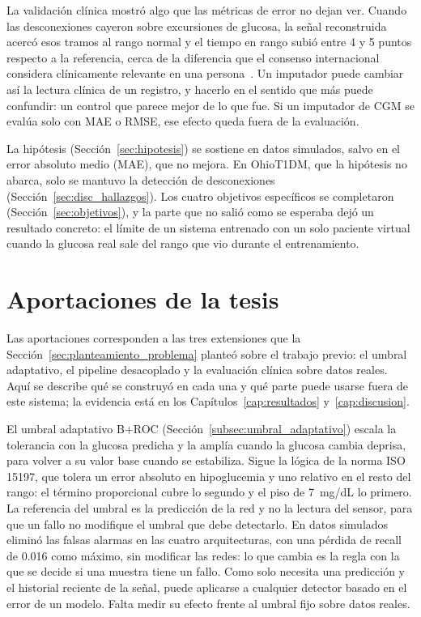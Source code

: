 \documentclass{report}
\begin{document}
La validación clínica mostró algo que las métricas de error no dejan ver. Cuando las desconexiones cayeron sobre excursiones de glucosa, la señal reconstruida acercó esos tramos al rango normal y el tiempo en rango subió entre 4 y 5 puntos respecto a la referencia, cerca de la diferencia que el consenso internacional considera clínicamente relevante en una persona~\cite{battelino2019}. Un imputador puede cambiar así la lectura clínica de un registro, y hacerlo en el sentido que más puede confundir: un control que parece mejor de lo que fue. Si un imputador de CGM se evalúa solo con MAE o RMSE, ese efecto queda fuera de la evaluación.

La hipótesis (Sección~\ref{sec:hipotesis}) se sostiene en datos simulados, salvo en el error absoluto medio (MAE), que no mejora. En OhioT1DM, que la hipótesis no abarca, solo se mantuvo la detección de desconexiones (Sección~\ref{sec:disc_hallazgos}). Los cuatro objetivos específicos se completaron (Sección~\ref{sec:objetivos}), y la parte que no salió como se esperaba dejó un resultado concreto: el límite de un sistema entrenado con un solo paciente virtual cuando la glucosa real sale del rango que vio durante el entrenamiento.

\section{Aportaciones de la tesis}
\label{sec:aportaciones}
 
Las aportaciones corresponden a las tres extensiones que la Sección~\ref{sec:planteamiento_problema} planteó sobre el trabajo previo: el umbral adaptativo, el pipeline desacoplado y la evaluación clínica sobre datos reales. Aquí se describe qué se construyó en cada una y qué parte puede usarse fuera de este sistema; la evidencia está en los Capítulos~\ref{cap:resultados} y~\ref{cap:discusion}.

El umbral adaptativo B+ROC (Sección~\ref{subsec:umbral_adaptativo}) escala la tolerancia con la glucosa predicha y la amplía cuando la glucosa cambia deprisa, para volver a su valor base cuando se estabiliza. Sigue la lógica de la norma ISO 15197, que tolera un error absoluto en hipoglucemia y uno relativo en el resto del rango: el término proporcional cubre lo segundo y el piso de 7~mg/dL lo primero. La referencia del umbral es la predicción de la red y no la lectura del sensor, para que un fallo no modifique el umbral que debe detectarlo. En datos simulados eliminó las falsas alarmas en las cuatro arquitecturas, con una pérdida de recall de 0.016 como máximo, sin modificar las redes: lo que cambia es la regla con la que se decide si una muestra tiene un fallo. Como solo necesita una predicción y el historial reciente de la señal, puede aplicarse a cualquier detector basado en el error de un modelo. Falta medir su efecto frente al umbral fijo sobre datos reales.
\end{document}
